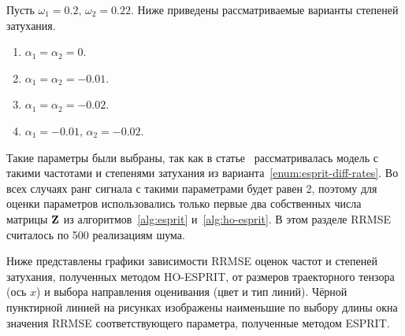 \documentclass[specialist,
  substylefile=spbu_report.rtx,
subf,href,colorlinks=true, 12pt]{disser}
\theoremstyle{plain}
\theoremstyle{definition}
\theoremstyle{remark}
\begin{document}
Пусть $\omega_1 = 0.2$, $\omega_2 = 0.22$.
Ниже приведены рассматриваемые варианты степеней затухания.
\begin{enumerate}
  \item\label{enum:esprit-no-rates} $\alpha_1=\alpha_2=0$.
  \item\label{enum:esprit-smalleq-rates} $\alpha_1=\alpha_2=-0.01$.
  \item\label{enum:esprit-bigeq-rates} $\alpha_1=\alpha_2=-0.02$.
  \item\label{enum:esprit-diff-rates} $\alpha_1= -0.01$, $\alpha_2=-0.02$.
\end{enumerate}
Такие параметры были выбраны, так как в статье~\cite{hosvd-hooi-separation}
рассматривалась модель с такими частотами и степенями затухания из
варианта~\ref{enum:esprit-diff-rates}.
Во всех случаях ранг сигнала с такими параметрами будет равен 2,
поэтому для оценки параметров
использовались только первые два собственных числа матрицы $\mathbf{Z}$ из
алгоритмов~\ref{alg:esprit}
и~\ref{alg:ho-esprit}.
В этом разделе RRMSE считалось по 500 реализациям шума.

Ниже представлены графики зависимости RRMSE оценок частот и
степеней затухания,
полученных методом HO-ESPRIT, от размеров траекторного тензора
(ось $x$) и выбора направления оценивания (цвет и тип линий).
Чёрной пунктирной линией на рисунках изображены наименьшие по выбору
длины окна значения RRMSE
соответствующего параметра, полученные методом ESPRIT.
\end{document}
